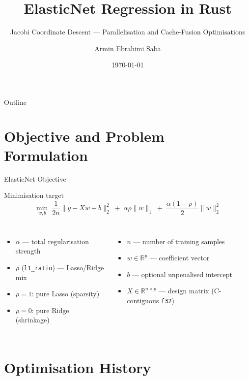 \documentclass[aspectratio=169]{beamer}
\title{ElasticNet Regression in Rust}
\subtitle{Jacobi Coordinate Descent — Parallelisation and Cache-Fusion Optimisations}
\author{Armin Ebrahimi Saba}
\date{\today}
\begin{document}
\begin{frame}
  \titlepage
\end{frame}

\begin{frame}{Outline}
  \tableofcontents
\end{frame}

\section{Objective and Problem Formulation}

\begin{frame}{ElasticNet Objective}
  \begin{block}{Minimisation target}
    \[
      \min_{w,b}\;\frac{1}{2n}\|y - Xw - b\|_2^2
      \;+\;\alpha\rho\|w\|_1
      \;+\;\frac{\alpha(1-\rho)}{2}\|w\|_2^2
    \]
  \end{block}
  \vspace{0.4em}
  \begin{columns}
    \begin{itemize}
      \item $\alpha$ — total regularisation strength
      \item $\rho$ (\texttt{l1\_ratio}) — Lasso/Ridge mix
      \item $\rho=1$: pure Lasso (sparsity)
      \item $\rho=0$: pure Ridge (shrinkage)
    \end{itemize}
    \begin{itemize}
      \item $n$ — number of training samples
      \item $w \in \mathbb{R}^p$ — coefficient vector
      \item $b$ — optional unpenalised intercept
      \item $X \in \mathbb{R}^{n \times p}$ — design matrix (C-contiguous \texttt{f32})
    \end{itemize}
  \end{columns}
\end{frame}

\section{Optimisation History}
\end{document}
